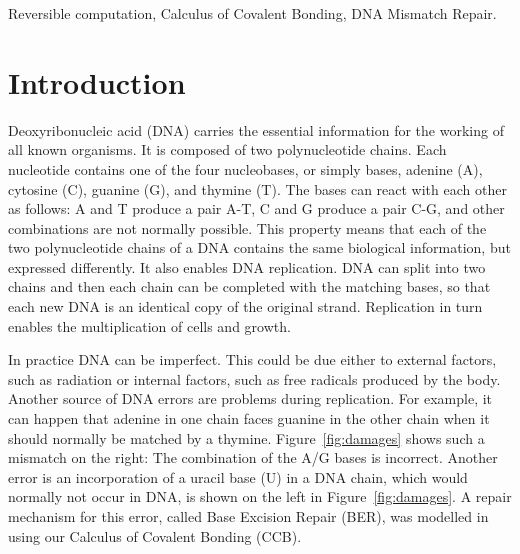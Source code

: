 \documentclass[review]{elsarticle}
\begin{document}
\begin{frontmatter}
\begin{keyword}Reversible computation, Calculus of Covalent Bonding, DNA Mismatch Repair.
\end{keyword}

\end{frontmatter}

\linenumbers

\section{Introduction}

Deoxyribonucleic acid (DNA) carries the essential information for the working of all known organisms. It is composed of two polynucleotide chains. Each nucleotide contains one of the four nucleobases, or simply bases,  adenine (A), cytosine (C), guanine (G), and thymine (T). 
The bases can react with each other as follows: A and T produce a pair A-T, C and G produce a pair C-G,
and other combinations are not normally possible. This property means that each of the two polynucleotide chains of a DNA contains the same biological information, but expressed differently. It also enables DNA replication. 
DNA can split into two chains and then each chain can be completed with the matching bases, so that each new DNA is an identical copy of the original strand. Replication in turn enables the multiplication of cells and growth.

In practice DNA can be imperfect. This could be due either to external factors, such as radiation 
or internal factors, such as free radicals produced by the body. Another source of DNA errors are problems during replication. For example, it can happen that adenine in one chain faces guanine in the other chain when it should normally be matched by a thymine. Figure~\ref{fig:damages} shows such a mismatch on the right: The combination of the A/G bases is incorrect. Another error is an incorporation of a uracil base (U) in a DNA chain, which would normally not occur in DNA, is shown on the left in Figure~\ref{fig:damages}. A repair mechanism for this error, called Base Excision Repair (BER), was modelled in \cite{10.1007/978-3-319-99498-7_8} using our Calculus of Covalent Bonding (CCB).
\end{document}
